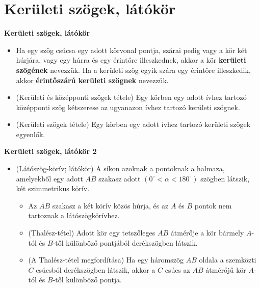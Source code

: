 \documentclass[11pt]{beamer}
\begin{document}
\section{\textbf{Kerületi szögek, látókör}}
\begin{frame}[<+->]
\begin{block}{\textbf{Kerületi szögek, látókör}}
\begin{itemize}[label=$\circ$]
\item Ha egy szög csúcsa egy adott körvonal pontja, szárai pedig vagy a kör két húrjára, vagy egy húrra és egy érintőre illeszkednek, akkor a kör \textbf{kerületi szögének} nevezzük. Ha a kerületi szög egyik szára egy érintőre illeszkedik, akkor \textbf{érintőszárú kerületi szögnek} nevezzük.
\item (Kerületi és középponti szögek tétele) Egy körben egy adott ívhez tartozó középponti szög kétszerese az ugyanazon ívhez tartozó kerületi szögnek.
\item (Kerületi szögek tétele) Egy körben egy adott ívhez tartozó kerületi szögek egyenlők.
\end{itemize}
\end{block}
\end{frame}

\begin{frame}[<+->]
\begin{block}{\textbf{Kerületi szögek, látókör 2}}
\begin{itemize}[label=$\circ$]
\item (Látószög-körív; látókör) A síkon azoknak a pontoknak a halmaza, amelyekből egy adott $AB$ szakasz adott $(0^\circ < \alpha < 180^\circ)$ szögben látszik, két szimmetrikus körív.
\begin{itemize}[label=$\circ$]
\item Az $AB$ szakasz  a két körív közös húrja, és az $A$ és $B$ pontok nem tartoznak a látószögkörívhez.
\item (Thalész-tétel) Adott kör egy tetszőleges $AB$ átmérője a kör bármely $A$-tól és $B$-től különböző pontjából derékszögben látszik.
\item (A Thalész-tétel megfordítása) Ha egy háromszög $AB$ oldala a szemközti $C$ csúcsból derékszögben látszik, akkor a $C$ csúcs az $AB$ átmérőjű kör $A$-tól és $B$-től különböző pontja.
\end{itemize}
\end{itemize}
\end{block}
\end{frame}
\end{document}

